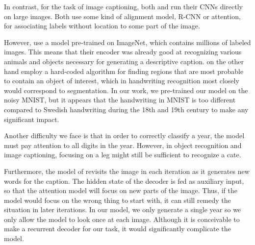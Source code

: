 In contrast, for the task of image captioning, both \textcite{AttendAndTell} and \textcite{VisualSemanticAlignment} run their CNNs directly on large images. Both use some kind of alignment model, R-CNN or attention, for associating labels without location to some part of the image.

However, \textcite{AttendAndTell} use a model pre-trained on ImageNet, which contains millions of labeled images. This means that their encoder was already good at recognizing various animals and objects necessary for generating a descriptive caption. \textcite{VisualSemanticAlignment} on the other hand employ a hard-coded algorithm for finding regions that are most probable to contain an object of interest, which in handwriting recognition most closely would correspond to segmentation.
In our work, we pre-trained our model on the noisy MNIST, but it appears that the handwriting in MNIST is too different compared to Swedish handwriting during the 18th and 19th century to make any significant impact.

Another difficulty we face is that in order to correctly classify a year, the model must pay attention to all digits in the year. However, in object recognition and image captioning, focusing on a leg might still be sufficient to recognize a cate.

Furthermore, the model of \textcite{AttendAndTell} revisits the image in each iteration as it generates new words for the caption. The hidden state of the decoder is fed as auxiliary input, so that the attention model will focus on new parts of the image. Thus, if the model would focus on the wrong thing to start with, it can still remedy the situation in later iterations.
In our model, we only generate a single year so we only allow the model to look once at each image. Although it is conceivable to make a recurrent decoder for our task, it would significantly complicate the model.



